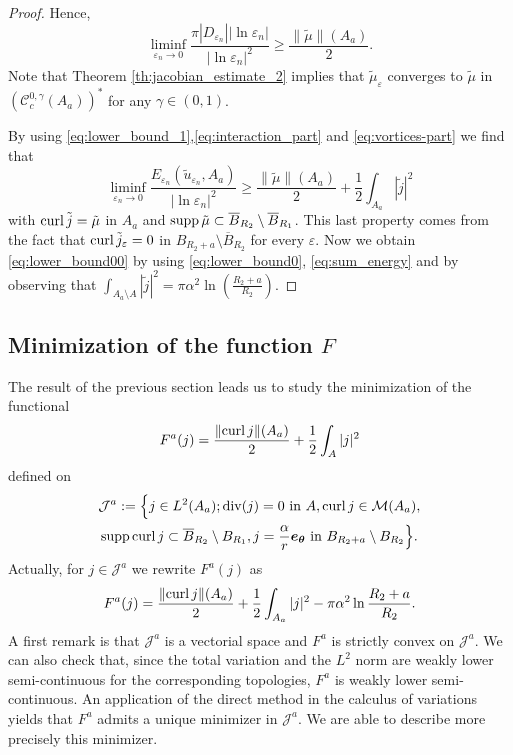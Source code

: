 \documentclass[12pt,reqno]{amsart}
\def\C{{\mathcal C}}
\def\M{{\mathcal M}}
\def\e {{\varepsilon}}
\renewcommand{\vec}[1]{\text{\boldmath $#1$}}
\def\curl{{\rm curl\,}}
\def\supp{{\rm supp\,}}
\def \J {{\mathcal J}}
\DeclareMathOperator \dive{\rm {div}}
\numberwithin{equation}{section}
\begin{document}
\begin{proof}
Hence,
\begin{equation}\label{eq:vortices-part}
\liminf_{\e_n \to 0} \frac{\pi |D_{\e_n}| |\ln {\e_n}|}{|\ln \e_n|^2}\geq \frac{\|\tilde{\mu}\|(A_a)}{2}.
\end{equation}
Note that Theorem \ref{th:jacobian_estimate_2} implies that \(\tilde{\mu}_\e\) converges to \(\tilde{\mu}\) in \((\C_c^{0,\gamma}(A_a))^*\) for any \(\gamma\in (0,1)\).

By using \eqref{eq:lower_bound_1},\eqref{eq:interaction_part} and \eqref{eq:vortices-part} we find that
\begin{equation}\label{eq:lower_bound0}
\liminf_{\e_n\to 0}\frac{E_{\e_n}(\tilde{u}_{\e_n},A_a)}{|\ln \e_n|^2}\geq  \frac{\|\tilde{\mu}\|(A_a)}{2}+ \frac12 \int_{A_a} |\tilde{j}|^2
\end{equation}
with \(\curl \tilde{j}=\tilde{\mu}\) in \(A_a\) and \(\supp\tilde{\mu} \subset \overline{B}_{R_2}\setminus \overline{B}_{R_1}\). This last property comes from the fact that \(\curl \tilde{j}_\e=0\) in \(B_{R_2+a}\setminus \overline{B}_{R_2}\) for every \(\e\). Now we obtain \eqref{eq:lower_bound00} by using \eqref{eq:lower_bound0}, \eqref{eq:sum_energy} and by observing that \(\int_{A_a\setminus A}|\tilde{j}|^2=\pi \alpha^2\ln (\frac{R_2+a}{R_2})\).
\end{proof}






\subsection{Minimization of the function \(F\)}\label{sec:min_F}

The result of the previous section leads us to study the minimization of the functional
\begin{equation}\label{eq:functionnelle_F}
F^a(j) =\frac{\|\curl j\|(A_a)}{2}+\frac{1}{2}\int_{A} |j|^2
\end{equation}
defined on
\begin{multline}\label{eq:min_space}
\mathcal{J}^a:=\Bigl\{j\in L^2(A_a); \dive (j)=0 \text{ in } A, \curl j \in \M(A_a), \\
\supp \curl j \subset \overline{B}_{R_2}\setminus B_{R_1}, j=\frac{\alpha}{r}\vec{e_\theta} \text{ in } B_{R_2+a}\setminus B_{R_2}\Bigr\}.
\end{multline}
Actually, for \(j\in \J^a\) we rewrite \(F^a(j)\) as 
\begin{equation}\label{eq:functionnelle_F_bis}
F^a(j) =\frac{\|\curl j\|(A_a)}{2}+\frac{1}{2}\int_{A_a} |j|^2-\pi \alpha^2 \ln \frac{R_2+a}{R_2}.
\end{equation}
A first remark is that \(\mathcal{J}^a\) is a vectorial space and \(F^a\) is strictly convex on \(\J^a\). We can also check that, since the total variation and the \(L^2\) norm are weakly lower semi-continuous for the corresponding topologies, \(F^a\) is weakly lower semi-continuous. An application of the direct method in the calculus of variations yields that \(F^a\) admits a unique minimizer in \(\mathcal{J}^a\). We are able to describe more precisely this minimizer.
\end{document}
